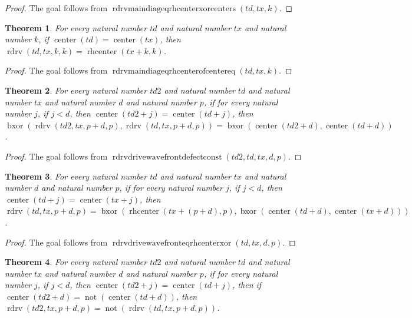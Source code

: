 \documentclass[11pt]{article}
\newtheorem{theorem}{Theorem}[section]
\theoremstyle{definition}
\begin{document}
\begin{proof}
The goal follows from \(\operatorname{rdrvmaindiageqrhcenterxorcenters}(td, tx, k)\).
\end{proof}
\begin{theorem}
\label{ll:paper:rdrv-main-diag-eq-rhcenter-of-center-eq}
For every natural number \(td\) and natural number \(tx\) and natural number \(k\), if \(\operatorname{center}(td) = \operatorname{center}(tx)\), then \(\operatorname{rdrv}(td, tx, k, k) = \operatorname{rhcenter}(tx + k, k)\).
\end{theorem}
\begin{proof}
The goal follows from \(\operatorname{rdrvmaindiageqrhcenterofcentereq}(td, tx, k)\).
\end{proof}
\begin{theorem}
\label{ll:paper:rdrv-drive-wavefront-defect-const}
For every natural number \(td2\) and natural number \(td\) and natural number \(tx\) and natural number \(d\) and natural number \(p\), if for every natural number \(j\), if \(j < d\), then \(\operatorname{center}(td2 + j) = \operatorname{center}(td + j)\), then \(\operatorname{bxor}(\operatorname{rdrv}(td2, tx, p + d, p), \operatorname{rdrv}(td, tx, p + d, p)) = \operatorname{bxor}(\operatorname{center}(td2 + d), \operatorname{center}(td + d))\).
\end{theorem}
\begin{proof}
The goal follows from \(\operatorname{rdrvdrivewavefrontdefectconst}(td2, td, tx, d, p)\).
\end{proof}
\begin{theorem}
\label{ll:paper:rdrv-drive-wavefront-eq-rhcenter-xor}
For every natural number \(td\) and natural number \(tx\) and natural number \(d\) and natural number \(p\), if for every natural number \(j\), if \(j < d\), then \(\operatorname{center}(td + j) = \operatorname{center}(tx + j)\), then \(\operatorname{rdrv}(td, tx, p + d, p) = \operatorname{bxor}(\operatorname{rhcenter}(tx + (p + d), p), \operatorname{bxor}(\operatorname{center}(td + d), \operatorname{center}(tx + d)))\).
\end{theorem}
\begin{proof}
The goal follows from \(\operatorname{rdrvdrivewavefronteqrhcenterxor}(td, tx, d, p)\).
\end{proof}
\begin{theorem}
\label{ll:paper:rdrv-drive-wavefront-flip-of-first-center-diff}
For every natural number \(td2\) and natural number \(td\) and natural number \(tx\) and natural number \(d\) and natural number \(p\), if for every natural number \(j\), if \(j < d\), then \(\operatorname{center}(td2 + j) = \operatorname{center}(td + j)\), then if \(\operatorname{center}(td2 + d) = \operatorname{not}(\operatorname{center}(td + d))\), then \(\operatorname{rdrv}(td2, tx, p + d, p) = \operatorname{not}(\operatorname{rdrv}(td, tx, p + d, p))\).
\end{theorem}
\end{document}

